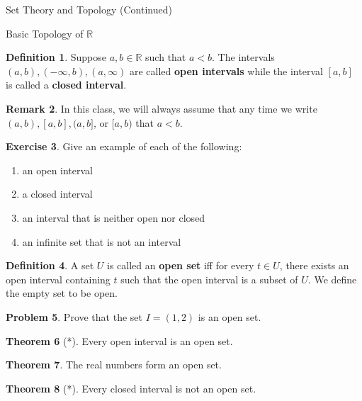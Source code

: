 \documentclass[11pt]{article}
\theoremstyle{definition}
\newtheorem{theorem}{Theorem}[section]
\newtheorem{definition}[theorem]{Definition}
\newtheorem{exercise}[theorem]{Exercise}
\newtheorem{problem}[theorem]{Problem}
\newtheorem{proposition}[theorem]{Proposition}
\newtheorem{remark}[theorem]{Remark}
\begin{document}
\begin{section}{Set Theory and Topology (Continued)}
\begin{subsection}{Basic Topology of $\mathbb{R}$}
\begin{definition}
Suppose $a,b\in\mathbb{R}$ such that $a<b$.  The intervals $(a,b), (-\infty,b), (a,\infty)$ are called \textbf{open intervals} while the interval $[a,b]$ is called a \textbf{closed interval}.
\end{definition}

\begin{remark} 
In this class, we will always assume that any time we write $(a,b), [a,b], (a,b]$, or $[a,b)$ that $a<b$. 
\end{remark}

\begin{exercise} Give an example of each of the following:
\begin{enumerate}
\item an open interval
\item a closed interval
\item an interval that is neither open nor closed
\item an infinite set that is not an interval
\end{enumerate}
\end{exercise}

\begin{definition}
A set $U$ is called an \textbf{open set} iff for every $t \in U$, there exists an open interval containing $t$ such that the open interval is a subset of $U$.  We define the empty set to be open.\end{definition}


\begin{problem} 
Prove that the set $I=(1,2)$ is an open set.
\end{problem}

\begin{theorem}[*]
Every open interval is an open set. 
\end{theorem}

\begin{theorem}
The real numbers form an open set.
\end{theorem}

\begin{theorem}[*]
Every closed interval is not an open set.
\end{theorem}


\end{subsection}
\end{section}
\end{document}
